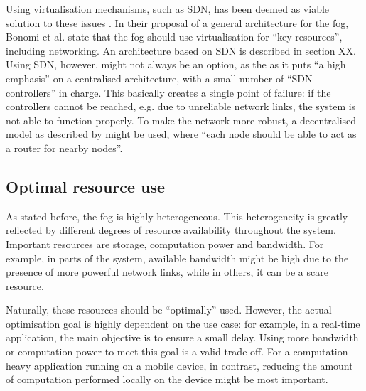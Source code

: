 \documentclass{article}
\begin{document}
Using virtualisation mechanisms, such as SDN, has been deemed as viable solution to these issues \cite{yi2015survey}. In their proposal of a general architecture for the fog, Bonomi et al. \cite{bonomi2014fog} state that the fog should use virtualisation for ``key resources'', including networking. An architecture based on SDN is described in section XX. Using SDN, however, might not always be an option, as the as it puts ``a high emphasis'' \cite{peng2016fog} on a centralised architecture, with a small number of ``SDN controllers'' in charge. This basically creates a single point of failure: if the controllers cannot be reached, e.g. due to unreliable network links, the system is not able to function properly. To make the network more robust, a decentralised model as described by \cite{yi2015survey} might be used, where  ``each node should be able to act as a router for nearby nodes''. 

\subsection{Optimal resource use}
\label{sub_opt_res_use}

As stated before, the fog is highly heterogeneous. This heterogeneity is greatly reflected by different degrees of resource availability throughout the system. Important resources are storage, computation power and bandwidth. For example, in parts of the system, available bandwidth might be high due to the presence of more powerful network links, while in others, it can be a scare resource.

Naturally, these resources should be ``optimally'' used. However, the actual optimisation goal is highly dependent on the use case: for example, in a real-time application, the main objective is to ensure a small delay. Using more bandwidth or computation power to meet this goal is a valid trade-off. For a computation-heavy application running on a mobile device, in contrast, reducing the amount of computation performed locally on the device might be most important.
\end{document}
